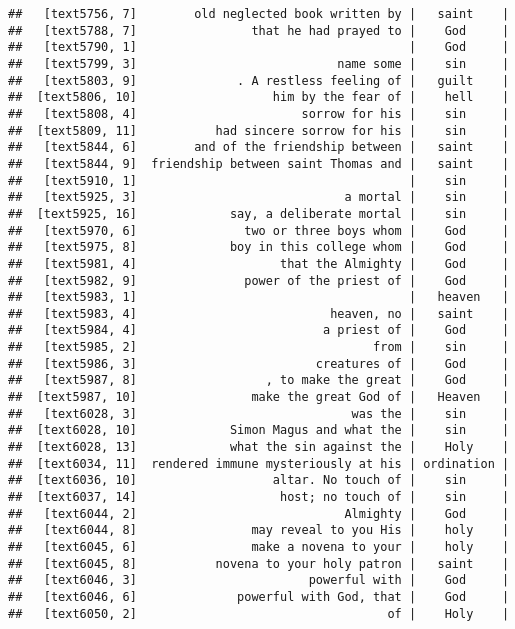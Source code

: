 \documentclass[]{article}
\begin{document}
\begin{verbatim}
##   [text5756, 7]        old neglected book written by |   saint    |
##   [text5788, 7]                that he had prayed to |    God     |
##   [text5790, 1]                                      |    God     |
##   [text5799, 3]                            name some |    sin     |
##   [text5803, 9]              . A restless feeling of |   guilt    |
##  [text5806, 10]                   him by the fear of |    hell    |
##   [text5808, 4]                       sorrow for his |    sin     |
##  [text5809, 11]           had sincere sorrow for his |    sin     |
##   [text5844, 6]        and of the friendship between |   saint    |
##   [text5844, 9]  friendship between saint Thomas and |   saint    |
##   [text5910, 1]                                      |    sin     |
##   [text5925, 3]                             a mortal |    sin     |
##  [text5925, 16]             say, a deliberate mortal |    sin     |
##   [text5970, 6]               two or three boys whom |    God     |
##   [text5975, 8]             boy in this college whom |    God     |
##   [text5981, 4]                    that the Almighty |    God     |
##   [text5982, 9]               power of the priest of |    God     |
##   [text5983, 1]                                      |   heaven   |
##   [text5983, 4]                           heaven, no |   saint    |
##   [text5984, 4]                          a priest of |    God     |
##   [text5985, 2]                                 from |    sin     |
##   [text5986, 3]                         creatures of |    God     |
##   [text5987, 8]                  , to make the great |    God     |
##  [text5987, 10]                make the great God of |   Heaven   |
##   [text6028, 3]                              was the |    sin     |
##  [text6028, 10]             Simon Magus and what the |    sin     |
##  [text6028, 13]             what the sin against the |    Holy    |
##  [text6034, 11]  rendered immune mysteriously at his | ordination |
##  [text6036, 10]                   altar. No touch of |    sin     |
##  [text6037, 14]                    host; no touch of |    sin     |
##   [text6044, 2]                             Almighty |    God     |
##   [text6044, 8]                may reveal to you His |    holy    |
##   [text6045, 6]                make a novena to your |    holy    |
##   [text6045, 8]           novena to your holy patron |   saint    |
##   [text6046, 3]                        powerful with |    God     |
##   [text6046, 6]              powerful with God, that |    God     |
##   [text6050, 2]                                   of |    Holy    |

\end{verbatim}
\end{document}
